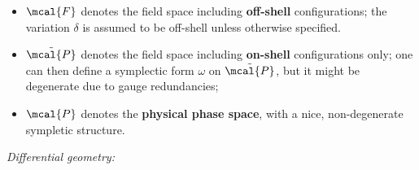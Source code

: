 \documentclass[a4paper
	,10pt
]{article}
\begin{document}
	\begin{itemize}
	\item $\mcal{F}$ denotes the field space including \textbf{off-shell} configurations; the variation $\delta$ is assumed to be off-shell unless otherwise specified.
	
	\item $\tilde{\mcal{P}}$ denotes the field space including \textbf{on-shell} configurations only; one can then define a symplectic form $\omega$ on $\tilde{\mcal{P}}$, but it might be degenerate due to gauge redundancies;
	
	\item $\mcal{P}$ denotes the \textbf{physical phase space}, with a nice, non-degenerate sympletic structure. 
	
	\end{itemize}
\smallskip
\textit{Differential geometry:}
	
\end{document}
